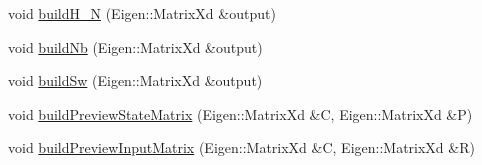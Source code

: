\begin{DoxyCompactItemize}
\item 
void \hyperlink{classMIQPController_ab093df4b1c73c02a97609093fd037345}{build\-H\-\_\-\-N} (\-Eigen\-::\-Matrix\-Xd \&output)
\item 
void \hyperlink{classMIQPController_a3860ad55d43b442069e806764ce48fc4}{build\-Nb} (\-Eigen\-::\-Matrix\-Xd \&output)
\item 
void \hyperlink{classMIQPController_a9dfdebb8c769d380617d47b513d1a2b1}{build\-Sw} (\-Eigen\-::\-Matrix\-Xd \&output)
\item 
void \hyperlink{classMIQPController_aad69912c4251ecb0d1a052131d17a96e}{build\-Preview\-State\-Matrix} (\-Eigen\-::\-Matrix\-Xd \&\-C, \-Eigen\-::\-Matrix\-Xd \&\-P)
\item 
void \hyperlink{classMIQPController_ac170171511569c7d2b9d76ebee30da47}{build\-Preview\-Input\-Matrix} (\-Eigen\-::\-Matrix\-Xd \&\-C, \-Eigen\-::\-Matrix\-Xd \&\-R)
\end{DoxyCompactItemize}
